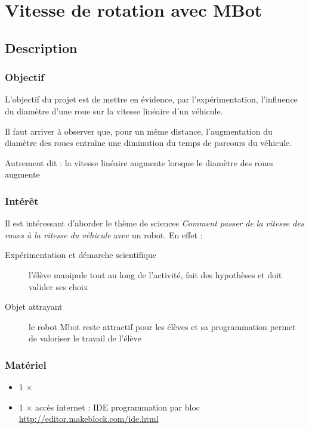 \section{Vitesse de rotation avec MBot}



\subsection{Description}

\subsubsection{Objectif}


\begin{formule}
L'objectif du projet est de mettre en évidence, par l'expérimentation, l'influence du diamètre d'une roue sur la vitesse linéaire d'un véhicule.

Il faut arriver à observer que, pour un même distance,  l'augmentation du diamètre des roues entraîne une diminution du temps de parcours du véhicule.

Autrement dit : la vitesse linéaire augmente lorsque le diamètre des roues augmente
\end{formule}


\subsubsection{Intérêt}

Il est intéressant d'aborder le thème de sciences \textit{Comment passer de la vitesse des roues à la vitesse du véhicule} avec un robot. En effet :

\begin{description}
    \item [Expérimentation et démarche scientifique] l'élève manipule tout au long de l'activité, fait des hypothèses et doit valider ses choix
    \item [Objet attrayant] le robot Mbot reste attractif pour les élèves et sa programmation permet de valoriser le travail de l'élève
\end{description}


\subsubsection{Matériel}
\begin{itemize}

    \item 1 $\times$ \matosMbot
   \item 1 $\times$ accès internet : IDE programmation par bloc \url{http://editor.makeblock.com/ide.html}
    
\end{itemize}



